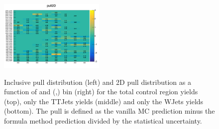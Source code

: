 \begin{figure}[h!]
  \includegraphics[width=0.45\textwidth]{figures/btagformula/validation/ValidationWJets2D} \\
  \caption{\label{fig:formula-validation-singlemu}
  Inclusive pull distribution (left) and 2D pull distribution as a function of \scalht and (\njet,\nb) bin (right) for
  the total \mj control region yields (top), only the TTJets yields (middle) and only the WJets yields (bottom).
  The pull is defined as the vanilla MC prediction minus the formula method prediction divided by the statistical uncertainty. }
\end{figure}


